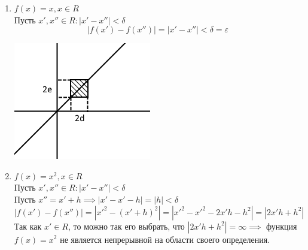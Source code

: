 \documentclass[12pt]{article}
\begin{document}
    \begin{enumerate}
        \item $f(x) = x, x \in R$\\
        Пусть $x', x'' \in R : |x' - x''| < \delta$
        \[
            |f(x') - f(x'')| = |x' - x''| < \delta = \varepsilon
        \]
        \begin{center}
            \includegraphics{3.9.2.png}
        \end{center}
        \item $f(x) = x^2, x \in R$\\
        Пусть $x', x'' \in R : |x' - x''| < \delta$\\
        Пусть $x'' = x' + h \implies |x' - x' - h| = |h| < \delta$
        \[ |f(x') - f(x'')| = |x'^2 - (x' + h)^2| = |x'^2 - x'^2 - 2x'h - h^2| = |2x'h + h^2| \]
        Так как $x' \in R$, то можно так его выбрать, что $|2x'h + h^2| = \infty \implies$ функция $f(x) = x^2$ не является непрерывной на области своего определения.
    \end{enumerate}
\end{document}
